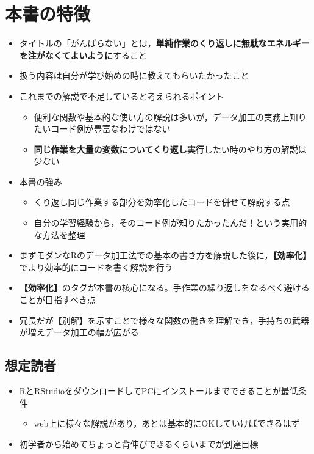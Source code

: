 \documentclass[
  xelatex,ja=standard, b5paper]{bxjsbook}
\providecommand{\tightlist}{%
  \setlength{\itemsep}{0pt}\setlength{\parskip}{0pt}}
\begin{document}
\hypertarget{ux672cux66f8ux306eux7279ux5fb4}{%
\section*{本書の特徴}\label{ux672cux66f8ux306eux7279ux5fb4}}

\begin{itemize}
\tightlist
\item
  タイトルの「がんばらない」とは，\textbf{単純作業のくり返しに無駄なエネルギーを注がなくてよいように}すること
\item
  扱う内容は自分が学び始めの時に教えてもらいたかったこと
\item
  これまでの解説で不足していると考えられるポイント

  \begin{itemize}
  \tightlist
  \item
    便利な関数や基本的な使い方の解説は多いが，データ加工の実務上知りたいコード例が豊富なわけではない
  \item
    \textbf{同じ作業を大量の変数についてくり返し実行}したい時のやり方の解説は少ない
  \end{itemize}
\item
  本書の強み

  \begin{itemize}
  \tightlist
  \item
    くり返し同じ作業する部分を効率化したコードを併せて解説する点
  \item
    自分の学習経験から，そのコード例が知りたかったんだ！という実用的な方法を整理
  \end{itemize}
\item
  まずモダンなRのデータ加工法での基本の書き方を解説した後に，\textbf{【効率化】}でより効率的にコードを書く解説を行う
\item
  \textbf{【効率化】}のタグが本書の核心になる。手作業の繰り返しをなるべく避けることが目指すべき点
\item
  冗長だが【別解】を示すことで様々な関数の働きを理解でき，手持ちの武器が増えデータ加工の幅が広がる
\end{itemize}

\hypertarget{ux60f3ux5b9aux8aadux8005}{%
\subsection*{想定読者}\label{ux60f3ux5b9aux8aadux8005}}

\begin{itemize}
\tightlist
\item
  RとRStudioをダウンロードしてPCにインストールまでできることが最低条件

  \begin{itemize}
  \tightlist
  \item
    web上に様々な解説があり，あとは基本的にOKしていけばできるはず
  \end{itemize}
\item
  初学者から始めてちょっと背伸びできるくらいまでが到達目標
\end{itemize}
\end{document}
